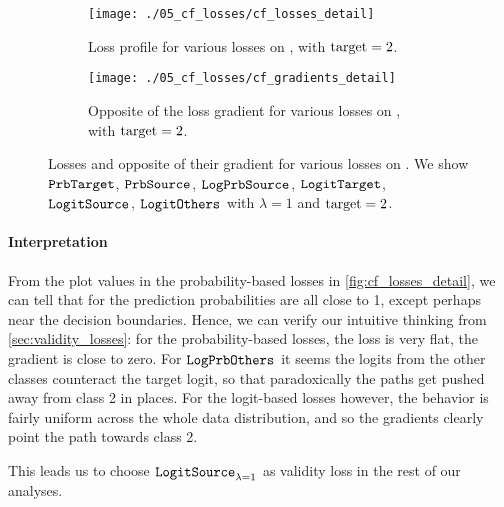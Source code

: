 \documentclass[../main.tex]{subfiles}
\begin{document}

\begin{figure}[htbp]
    \centering
    \begin{subfigure}[b]{\textwidth}
        \centering
        \texttt{[image: ./05\_cf\_losses/cf\_losses\_detail]}
        \caption{Loss profile for various losses on \CakeOnSea, with ${\mathrm{target} = 2}$.}
        \label{fig:cf_losses_detail}
    \end{subfigure}

    \vspace*{\floatsep}%

    \begin{subfigure}[b]{\textwidth}
        \centering
        \texttt{[image: ./05\_cf\_losses/cf\_gradients\_detail]}
        \caption{Opposite of the loss gradient for various losses on \CakeOnSea, with ${\mathrm{target} = 2}$.}
        \label{fig:cf_gradients_detail}
    \end{subfigure}

    \caption{Losses and opposite of their gradient for various losses on \CakeOnSea.
    We show $\mathtt{PrbTarget}{}$, $\mathtt{PrbSource}_{}$, $\mathtt{LogPrbSource}_{}$, $\mathtt{LogitTarget}{}$, $\mathtt{LogitSource}_{}$, $\mathtt{LogitOthers}_{}$
     with $\lambda =1$ and $\mathrm{target} = 2$.}
\end{figure}

\paragraph{Interpretation}

From the plot values in the probability-based losses in \autoref{fig:cf_losses_detail}, we can tell that for \CakeOnSea{} the prediction probabilities are all close to 1, except perhaps near the decision boundaries.
Hence, we can verify our intuitive thinking from \autoref{sec:validity_losses}: for the probability-based losses, the loss is very flat, \ie{} the gradient is close to zero.
For $\mathtt{LogPrbOthers}_{}$ it seems the logits from the other classes counteract the target logit, so that paradoxically the paths get pushed away from class 2 in places.
For the logit-based losses however, the behavior is fairly uniform across the whole data distribution, and so the gradients clearly point the path towards class 2.

This leads us to choose $\mathtt{LogitSource}_{\lambda=1}$ as validity loss in the rest of our analyses.
\end{document}
